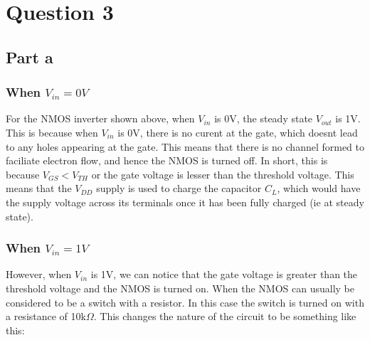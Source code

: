 \documentclass{article}
\begin{document}
\section*{Question 3}
\subsection*{Part a}
\subsubsection*{When $V_{in} = 0V$}
For the NMOS inverter shown above, when $V_{in}$ is 0V, the steady state $V_{out}$ is 1V.
This is because when $V_{in}$ is 0V, there is no curent at the gate, which doesnt lead to any holes appearing at the gate.
This means that there is no channel formed to faciliate electron flow, and hence the NMOS is turned off.
In short, this is because $V_{GS} < V_{TH}$ or the gate voltage is lesser than the threshold voltage.
This means that the $V_{DD}$ supply is used to charge the capacitor $C_{L}$, which would have the supply voltage across its terminals once it has been fully charged (ie at steady state).

\subsubsection*{When $V_{in} = 1V$}
However, when $V_{in}$ is 1V, we can notice that the gate voltage is greater than the threshold voltage and the NMOS is turned on.
When the NMOS can usually be considered to be a switch with a resistor. In this case the switch is turned on with a resistance of 10k$\Omega$.
This changes the nature of the circuit to be something like this:
\end{document}
